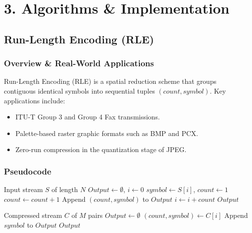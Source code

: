 \documentclass{article}
\begin{document}
\cleardoublepage
\newpage

\section*{3. Algorithms \& Implementation}
\setcounter{section}{3}
\setcounter{subsection}{0}
\setcounter{subsubsection}{0}

\subsection{Run-Length Encoding (RLE)}

\subsubsection{Overview \& Real-World Applications}
Run-Length Encoding (RLE) is a spatial reduction scheme that groups contiguous identical symbols into sequential tuples $(count, symbol)$. Key applications include:
\begin{itemize}
    \item ITU-T Group 3 and Group 4 Fax transmissions.
    \item Palette-based raster graphic formats such as BMP and PCX.
    \item Zero-run compression in the quantization stage of JPEG.
\end{itemize}

\subsubsection{Pseudocode}
\begin{algorithm}[H]
\caption{RLE Compression}
\label{alg:rle_compress}
\begin{algorithmic}[1]
\REQUIRE Input stream $S$ of length $N$
\STATE $Output \gets \emptyset$, $i \gets 0$
    \STATE $symbol \gets S[i]$, $count \gets 1$
        \STATE $count \gets count + 1$
    \ENDWHILE
    \STATE Append $(count, symbol)$ to $Output$
    \STATE $i \gets i + count$
\ENDWHILE
\RETURN $Output$
\end{algorithmic}
\end{algorithm}

\begin{algorithm}[H]
\caption{RLE Decompression}
\label{alg:rle_decompress}
\begin{algorithmic}[1]
\REQUIRE Compressed stream $C$ of $M$ pairs
\STATE $Output \gets \emptyset$
    \STATE $(count, symbol) \gets C[i]$
        \STATE Append $symbol$ to $Output$
    \ENDFOR
\ENDFOR
\RETURN $Output$
\end{algorithmic}
\end{algorithm}
\end{document}
